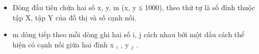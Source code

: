 \begin{itemize}
	\item     Dòng đầu tiên chứa hai số x, y, m  (x, y ≤ 1000), theo thứ tự là số đỉnh thuộc tập X, tập Y của đồ thị và số cạnh nối.   
	\item     m dòng tiếp theo mỗi dòng ghi hai số i, j cách nhau bởi một dấu cách thể hiện có cạnh nối giữa hai đỉnh x    $_     i    $    , y    $_     j    $    .   
\end{itemize}

\